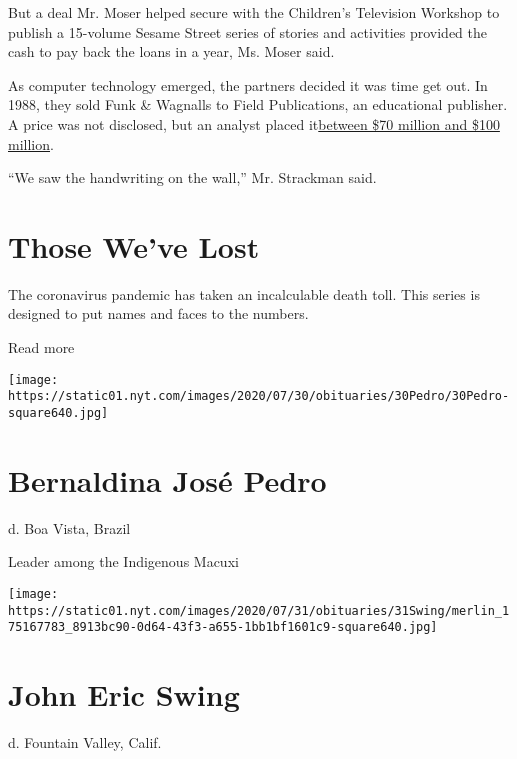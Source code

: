 But a deal Mr. Moser helped secure with the Children's Television
Workshop to publish a 15-volume Sesame Street series of stories and
activities provided the cash to pay back the loans in a year, Ms. Moser
said.

As computer technology emerged, the partners decided it was time get
out. In 1988, they sold Funk \& Wagnalls to Field Publications, an
educational publisher. A price was not disclosed, but an analyst placed
it\href{https://www.nytimes.com/1988/05/27/business/the-media-business-field-publications-agrees-to-buy-funk-wagnalls.html}{between
\$70 million and \$100 million}.

``We saw the handwriting on the wall,'' Mr. Strackman said.

\href{https://www.nytimes.com/interactive/2020/obituaries/people-died-coronavirus-obituaries.html?action=click\&pgtype=Article\&state=default\&region=BELOW_MAIN_CONTENT\&context=covid_obits_promo}{}

\hypertarget{those-weve-lost}{%
\section{Those We've Lost}\label{those-weve-lost}}

The coronavirus pandemic has taken an incalculable death toll. This
series is designed to put names and faces to the numbers.

Read more

\texttt{[image: https://static01.nyt.com/images/2020/07/30/obituaries/30Pedro/30Pedro-square640.jpg]}

\hypertarget{bernaldina-josuxe9-pedro}{%
\section{Bernaldina José Pedro}\label{bernaldina-josuxe9-pedro}}

d. Boa Vista, Brazil

Leader among the Indigenous Macuxi

\texttt{[image: https://static01.nyt.com/images/2020/07/31/obituaries/31Swing/merlin\_175167783\_8913bc90-0d64-43f3-a655-1bb1bf1601c9-square640.jpg]}

\hypertarget{john-eric-swing}{%
\section{John Eric Swing}\label{john-eric-swing}}

d. Fountain Valley, Calif.

